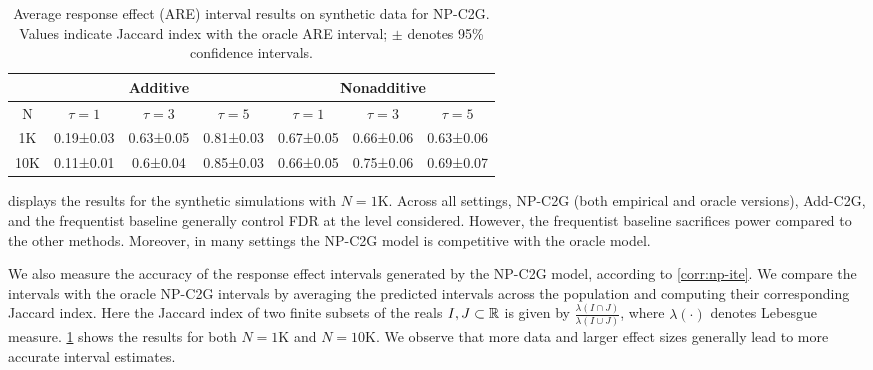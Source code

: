 %
%
%
%
%
%
%
%
%
%
%
%
%
%
%
%
%
%

\begin{table}[t]
\centering
\begin{tabular}{||c|c|c|c|c|c|c||}
\hline
& \multicolumn{3}{|c|}{Additive} & \multicolumn{3}{|c|}{Nonadditive} \\
\hline
N & $\tau=1$ & $\tau=3$ & $\tau=5$ & $\tau=1$ & $\tau=3$ & $\tau=5$ \\
\hline
1K & 0.19±0.03 & 0.63±0.05 & 0.81±0.03 & 0.67±0.05 & 0.66±0.06 & 0.63±0.06 \\
10K & 0.11±0.01 & 0.6±0.04 & 0.85±0.03 & 0.66±0.05 & 0.75±0.06 & 0.69±0.07 \\
\hline
\end{tabular}
\caption{Average response effect (ARE) interval results on synthetic data for NP-C2G. Values indicate Jaccard index with the oracle ARE interval; $\pm$ denotes 95\% confidence intervals. }
\label{table:nonadditive-jaccard-ite}
\end{table}

 displays the results for the synthetic simulations with $N=1$K. Across all settings, NP-C2G (both empirical and oracle versions), Add-C2G, and the frequentist baseline generally control FDR at the level considered. However, the frequentist baseline sacrifices power compared to the other methods. Moreover, in many settings the NP-C2G model is competitive with the oracle model.


We also measure the accuracy of the response effect intervals generated by the NP-C2G model, according to \cref{corr:np-ite}. We compare the intervals with the oracle NP-C2G intervals by averaging the predicted intervals across the population and computing their corresponding Jaccard index. Here the Jaccard index of two finite subsets of the reals $I, J \subset \mathbb{R}$ is given by $\frac{\lambda(I \cap J)}{\lambda(I \cup J)}$, where $\lambda(\cdot)$ denotes Lebesgue measure. \cref{table:nonadditive-jaccard-ite} shows the results for both $N=1$K and $N=10$K. We observe that more data and larger effect sizes generally lead to more accurate interval estimates.

 












